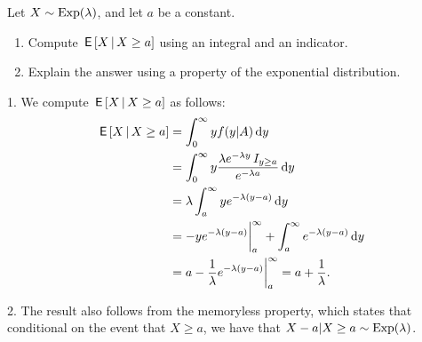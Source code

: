 \begin{exercise}
Let $X \sim \mathrm{Exp}(\lambda)$, and let $a$ be a constant.
\begin{enumerate}
\item Compute $\,\mathsf{E}\left[X \,\middle|\, X \geq a\right]$ using an integral and an indicator.
\item Explain the answer using a property of the exponential distribution.
\end{enumerate}
\begin{solution}
1. We compute $\,\mathsf{E}\left[X \,\middle|\, X \geq a\right]$ as follows:
\begin{align*} \,\mathsf{E}\left[X \,\middle|\, X \geq a\right] &= \int_0^\infty y f(y|A) \,\textrm{d}y
\\ &= \int_0^\infty y \frac{\lambda e^{-\lambda y} \,I_{y \geq a}}{e^{-\lambda a}} \,\textrm{d}y
\\ &= \lambda \int_a^\infty y e^{-\lambda (y-a)} \,\textrm{d}y
\\ &= -y e^{-\lambda (y-a)}\biggr|_a^\infty +  \int_a^\infty e^{-\lambda (y-a)} \,\textrm{d}y
\\ &= a   - \frac1{\lambda} e^{-\lambda (y-a)}\biggr|_a^\infty   = a+\frac1\lambda.    \end{align*}

2.
The result also follows from the memoryless property, which states that conditional on the event that $X \geq a$, we have that $X-a | X \geq a \sim\mathrm{Exp}(\lambda)$.
\end{solution}
\end{exercise}

